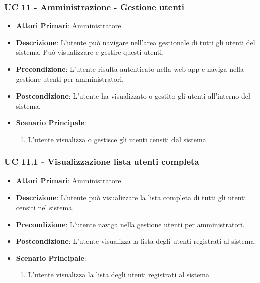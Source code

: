 \subsubsection{UC 11 - Amministrazione - Gestione utenti}

		\begin{itemize}
			\item \textbf{Attori Primari}: Amministratore.
			\item \textbf{Descrizione}: L'utente può navigare nell'area gestionale di tutti gli utenti del sistema. Può visualizzare e gestire questi utenti. 
			\item \textbf{Precondizione}: L'utente risulta autenticato nella web app e naviga nella gestione utenti per amministratori.
			\item \textbf{Postcondizione}: L'utente ha visualizzato o gestito gli utenti all'interno del sistema. 
			\item \textbf{Scenario Principale}:
			\begin{enumerate}
				\item{L'utente visualizza o gestisce gli utenti censiti dal sistema}
			\end{enumerate}	
		\end{itemize}

			\subsubsection{UC 11.1 - Visualizzazione lista utenti completa}
			\begin{itemize}
				\item \textbf{Attori Primari}: Amministratore.
				\item \textbf{Descrizione}: L'utente può visualizzare la lista completa di tutti gli utenti censiti nel sistema.
				\item \textbf{Precondizione}: L'utente naviga nella gestione utenti per amministratori.
				\item \textbf{Postcondizione}: L'utente visualizza la lista degli utenti registrati al sistema.
				\item \textbf{Scenario Principale}:
				\begin{enumerate}
					\item{L'utente visualizza la lista degli utenti registrati al sistema}
				\end{enumerate}	
			\end{itemize}
			
